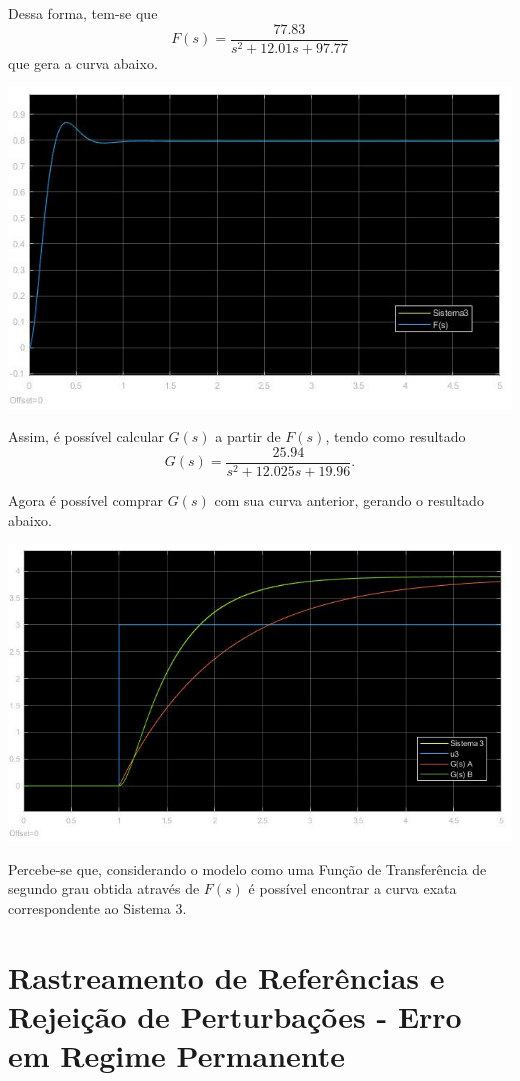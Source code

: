 \documentclass[
]{book}
\theoremstyle{definition}
\theoremstyle{definition}
\theoremstyle{definition}
\theoremstyle{remark}
\begin{document}
Dessa forma, tem-se que
\[
F(s) = \frac {77.83}{s^2+ 12.01s +97.77}
\]
que gera a curva abaixo.

\includegraphics{Imagens/Lab3/Resolução/prob3BA.jpg}

Assim, é possível calcular \(G(s)\) a partir de \(F(s)\), tendo como resultado
\[
G(s) = \frac {25.94}{s^2+12.025s+19.96}.
\]

Agora é possível comprar \(G(s)\) com sua curva anterior, gerando o resultado abaixo.

\includegraphics{Imagens/Lab3/Resolução/prob3BB.jpg}

Percebe-se que, considerando o modelo como uma Função de Transferência de segundo grau obtida através de \(F(s)\) é possível encontrar a curva exata correspondente ao Sistema 3.

\hypertarget{lab4}{%
\chapter{Rastreamento de Referências e Rejeição de Perturbações - Erro em Regime Permanente}\label{lab4}}
\end{document}

